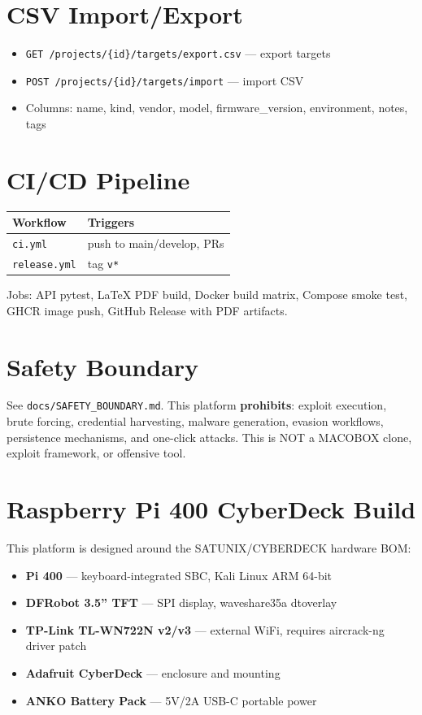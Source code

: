 \documentclass[11pt,a4paper]{article}
\begin{document}
\section{CSV Import/Export}
\begin{itemize}
  \item \texttt{GET /projects/\{id\}/targets/export.csv} --- export targets
  \item \texttt{POST /projects/\{id\}/targets/import} --- import CSV
  \item Columns: name, kind, vendor, model, firmware\_version, environment, notes, tags
\end{itemize}

\section{CI/CD Pipeline}
\begin{tabular}{ll}
\toprule
\textbf{Workflow} & \textbf{Triggers} \\
\midrule
\texttt{ci.yml}      & push to main/develop, PRs \\
\texttt{release.yml} & tag \texttt{v*} \\
\bottomrule
\end{tabular}

Jobs: API pytest, LaTeX PDF build, Docker build matrix, Compose smoke test,
GHCR image push, GitHub Release with PDF artifacts.

\section{Safety Boundary}
See \texttt{docs/SAFETY\_BOUNDARY.md}.  This platform \textbf{prohibits}:
exploit execution, brute forcing, credential harvesting, malware generation,
evasion workflows, persistence mechanisms, and one-click attacks.
This is NOT a MACOBOX clone, exploit framework, or offensive tool.

\section{Raspberry Pi 400 CyberDeck Build}
This platform is designed around the SATUNIX/CYBERDECK hardware BOM:
\begin{itemize}
  \item \textbf{Pi 400} --- keyboard-integrated SBC, Kali Linux ARM 64-bit
  \item \textbf{DFRobot 3.5'' TFT} --- SPI display, waveshare35a dtoverlay
  \item \textbf{TP-Link TL-WN722N v2/v3} --- external WiFi, requires aircrack-ng driver patch
  \item \textbf{Adafruit CyberDeck} --- enclosure and mounting
  \item \textbf{ANKO Battery Pack} --- 5V/2A USB-C portable power
\end{itemize}
\end{document}
